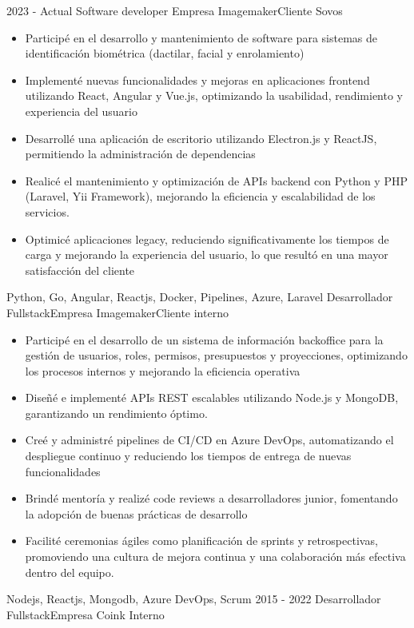 %
%
%
\begin{experiences}
  \experience
    {2023 - Actual}  {Software developer} {Empresa Imagemaker}{Cliente Sovos}
    {} {
        \begin{itemize}
          \item Participé en el desarrollo y mantenimiento de software para sistemas de identificación biométrica (dactilar, facial y enrolamiento) 
          \item Implementé nuevas funcionalidades y mejoras en aplicaciones frontend utilizando React, Angular y Vue.js, optimizando la usabilidad, rendimiento y experiencia del usuario
          \item Desarrollé una aplicación de escritorio utilizando Electron.js y ReactJS, permitiendo la administración de dependencias
          \item Realicé el mantenimiento y optimización de APIs backend con Python y PHP (Laravel, Yii Framework), mejorando la eficiencia y escalabilidad de los servicios.
          \item Optimicé aplicaciones legacy, reduciendo significativamente los tiempos de carga y mejorando la experiencia del usuario, lo que resultó en una mayor satisfacción del cliente
        \end{itemize}
       }
       { Python, Go, Angular, Reactjs, Docker, Pipelines, Azure, Laravel}
  \emptySeparator
  \experience
    {}   {Desarrollador Fullstack}{Empresa Imagemaker}{Cliente interno}
    {} {
        \begin{itemize}
          \item Participé en el desarrollo de un sistema de información backoffice para la gestión de usuarios, roles, permisos, presupuestos y proyecciones, optimizando los procesos internos y mejorando la eficiencia operativa
          \item Diseñé e implementé APIs REST escalables utilizando Node.js y MongoDB, garantizando un rendimiento óptimo.
          \item Creé y administré pipelines de CI/CD en Azure DevOps, automatizando el despliegue continuo y reduciendo los tiempos de entrega de nuevas funcionalidades
          \item Brindé mentoría y realizé code reviews a desarrolladores junior, fomentando la adopción de buenas prácticas de desarrollo
          \item Facilité ceremonias ágiles como planificación de sprints y retrospectivas, promoviendo una cultura de mejora continua y una colaboración más efectiva dentro del equipo.
        \end{itemize}
       }
       { Nodejs, Reactjs, Mongodb, Azure DevOps, Scrum }
  \emptySeparator  
  \experience
    {2015 - 2022} {Desarrollador Fullstack}{Empresa Coink} {Interno}
    {}    {

}
\end{experiences}
